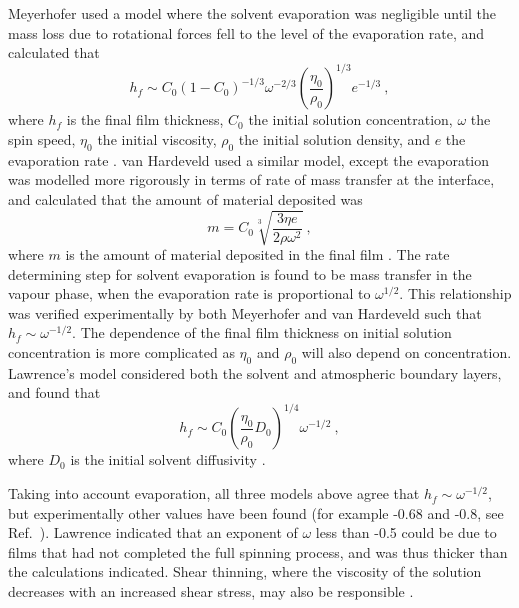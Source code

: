 Meyerhofer used a model where the solvent evaporation was negligible until the mass loss due to rotational forces fell to the level of the evaporation rate, and calculated that
\begin{equation}
h_f \sim C_0(1-C_0)^{-1/3} \omega^{-2/3} \left( \frac{\eta_0}{\rho_0} \right)^{1/3} e^{-1/3} ~,
\label{Meyehofer}
\end{equation}
where $h_f$ is the final film thickness, $C_0$ the initial solution concentration, $\omega$ the spin speed, $\eta_0$ the initial viscosity, $\rho_0$ the initial solution density, and $e$ the evaporation rate \cite{Meyerhofer1978}. van Hardeveld used a similar model, except the evaporation was modelled more rigorously in terms of rate of mass transfer at the interface, and calculated that the amount of material deposited was
\begin{equation}
m = C_0 \sqrt[3]{\frac{3 \eta e}{2 \rho {\omega}^2}} ~,
\label{Hardeveld}
\end{equation}
where $m$ is the amount of material deposited in the final film \cite{VanHardeveld1995}. The rate determining step for solvent evaporation is found to be mass transfer in the vapour phase, when the evaporation rate is proportional to ${\omega}^{1/2}$. This relationship was verified experimentally by both Meyerhofer and van Hardeveld \cite{Meyerhofer1978, VanHardeveld1995} such that $h_f \sim \omega^{-1/2}$. The dependence of the final film thickness on initial solution concentration is more complicated as $\eta_0$ and $\rho_0$ will also depend on concentration. Lawrence's model considered both the solvent and atmospheric boundary layers, and found that
\begin{equation}
h_f \sim C_0 \left(\frac{\eta_0}{\rho_0} D_0 \right)^{1/4} \omega^{-1/2} ~,
\label{Lawrence}
\end{equation}
where $D_0$ is the initial solvent diffusivity \cite{Lawrence1988}.

Taking into account evaporation, all three models above agree that $h_f \sim \omega^{-1/2}$, but experimentally other values have been found (for example -0.68 and -0.8, see Ref.\ \cite{Lawrence1988}). Lawrence indicated that an exponent of $\omega$ less than -0.5 could be due to films that had not completed the full spinning process, and was thus thicker than the calculations indicated. Shear thinning, where the viscosity of the solution decreases with an increased shear stress, may also be responsible \cite{Lawrence1988}.

